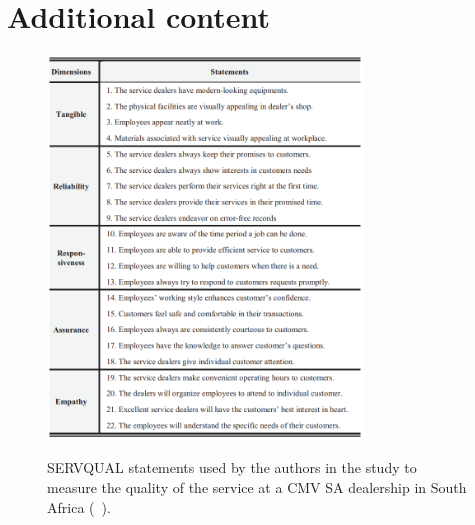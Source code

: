 \chapter{Additional content}


\begin{figure}[h]
  \caption{SERVQUAL statements used by the authors in the study to measure the quality of the service at a CMV SA dealership in South Africa (~\cite{Measuring_After_sales_Service_Quality}).}
  \centering
  \includegraphics[width=0.75\textwidth]{figs/SERVQUAL_statements}
  \label{fig:SERVQUAL_statements}
\end{figure}


